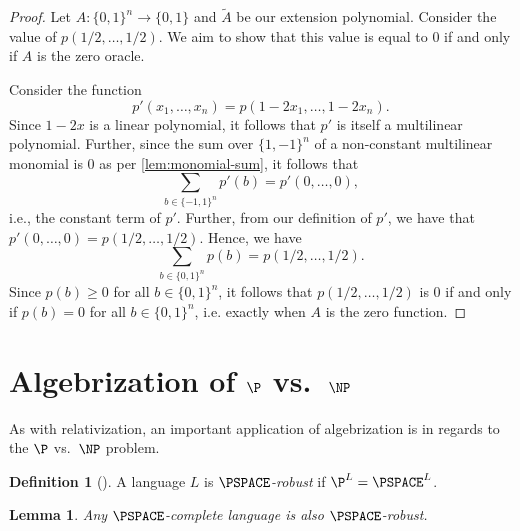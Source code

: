 \documentclass[english,12pt]{reedthesis}
\theoremstyle{plain}
\newtheorem{lemma}[lemma]{Lemma}
\theoremstyle{definition}
\newtheorem{defn}[defn]{Definition}
\theoremstyle{remark}
\begin{document}
\begin{proof}
  Let $A: \{0, 1\}^{n} \rightarrow \{0, 1\}$ and $\tilde{A}$ be our extension polynomial.
  Consider the value of $p(1/2, \ldots, 1/2)$. We aim to show that this value is
  equal to $0$ if and only if $A$ is the zero oracle.

  Consider the function
  \begin{equation}
    p'(x_{1}, \ldots, x_{n}) = p(1 - 2x_{1}, \ldots, 1 - 2x_{n}).
  \end{equation}
  Since $1 - 2x$ is a linear polynomial, it follows that $p'$ is itself a
  multilinear polynomial. Further, since the sum over $\{1, -1\}^{n}$ of a
  non-constant multilinear monomial is 0 as per \cref{lem:monomial-sum}, it
  follows that
  \begin{equation}
    \sum_{b \in \{-1, 1\}^{n}}p'(b) = p'(0, \ldots, 0),
  \end{equation}
  i.e., the constant term of $p'$. Further, from our definition of $p'$, we have
  that $p'(0, \ldots, 0) = p(1/2, \ldots, 1/2)$. Hence, we have
  \begin{equation}
    \sum_{b \in \{0, 1\}^{n}}p(b) = p(1/2, \ldots, 1/2).
  \end{equation}
  Since $p(b) \ge 0$ for all $b \in \{0, 1\}^{n}$, it follows that $p(1/2, \ldots, 1/2)$
  is 0 if and only if $p(b) = 0$ for all $b \in \{0, 1\}^{n}$, i.e. exactly when
  $A$ is the zero function.
\end{proof}


\section{Algebrization of $\P$ vs.\ $\NP$}\label{sec:alg-p-np}

As with relativization, an important application of algebrization is in regards
to the $\P$ vs.\ $\NP$ problem.

\begin{defn}[{\cite[Def.\ 6.1]{BFL90}}]\label{def:pspace-robust}
  A language $L$ is \emph{$\PSPACE$-robust} if $\P^{L} = \PSPACE^{L}$.
\end{defn}

\begin{lemma}\label{lem:complete-is-robust}
  Any $\PSPACE$-complete language is also $\PSPACE$-robust.
\end{lemma}
\end{document}
